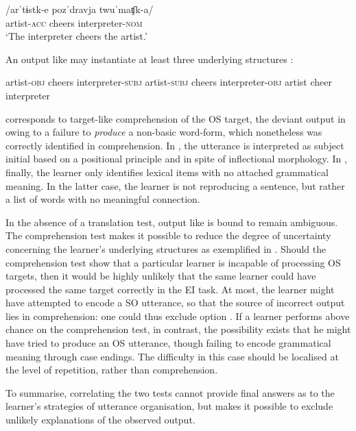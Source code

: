 \ea%
    \label{ex:06:2}
    \gll    /arˈtɨstk-e  pozˈdravja  twuˈmaʧk-a/\\
            artist-\textsc{acc}  cheers    interpreter-\textsc{nom}\\
    \glt    `The interpreter cheers the artist.'
    \z

An output like  may instantiate at least three underlying structures :

\ea%
    \label{ex:06:3}
    \ea\label{ex:06:3a}
    artist-\textsc{obj}  cheers    interpreter-\textsc{subj}
    \ex\label{ex:06:3b}
    artist-\textsc{subj}  cheers    interpreter-\textsc{obj}
    \ex\label{ex:06:3c}
    artist     cheer    interpreter
    \z
\z

 corresponds to target-like comprehension of the OS target, the deviant output in  owing to a failure to \textit{produce} a non-basic word-form, which nonetheless was correctly identified in comprehension. In , the utterance is interpreted as subject initial based on a positional principle and in spite of inflectional morphology. In , finally, the learner only identifies lexical items with no attached grammatical meaning. In the latter case, the learner is not reproducing a sentence, but rather a list of words with no meaningful connection.

In the absence of a translation test, output like  is bound to remain ambiguous. The comprehension test makes it possible to reduce the degree of uncertainty concerning the learner’s underlying structures as exemplified in . Should the comprehension test show that a particular learner is incapable of processing OS targets, then it would be highly unlikely that the same learner could have processed the same target correctly in the EI task. At most, the learner might have attempted to encode a SO utterance, so that the source of incorrect output lies in comprehension: one could thus exclude option . If a learner performs above chance on the comprehension test, in contrast, the possibility exists that he might have tried to produce an OS utterance, though failing to encode grammatical meaning through case endings. The difficulty in this case should be localised at the level of repetition, rather than comprehension.

To summarise, correlating the two tests cannot provide final answers as to the learner's strategies of utterance organisation, but makes it possible to exclude unlikely explanations of the observed output.

